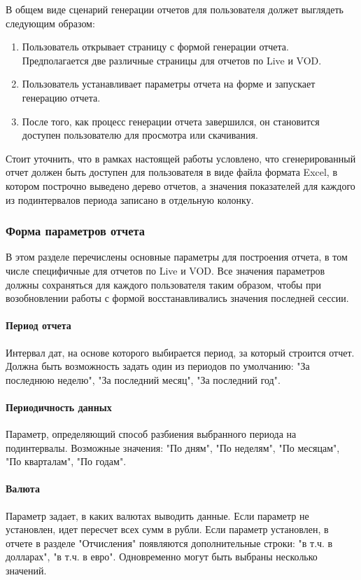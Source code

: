 В общем виде сценарий генерации отчетов для пользователя должет выглядеть следующим образом:
\begin{enumerate}
\item{
  Пользователь открывает страницу с формой генерации отчета. Предполагается две различные страницы
  для отчетов по Live и VOD.
}
\item{
  Пользователь устанавливает параметры отчета на форме и запускает генерацию отчета.
}
\item{
  После того, как процесс генерации отчета завершился, он становится доступен пользователю для просмотра
  или скачивания.
}
\end{enumerate} 

Стоит уточнить, что в рамках настоящей работы условлено, что сгенерированный отчет должен быть доступен 
для пользователя в виде файла формата Excel, в котором построчно выведено дерево отчетов, а значения показателей
для каждого из подинтервалов периода записано в отдельную колонку.

\subsubsection{Форма параметров отчета}
В этом разделе перечислены основные параметры для построения отчета, в том числе специфичные для отчетов
по Live и VOD. Все значения параметров должны сохраняться для каждого пользователя таким образом,
чтобы при возобновлении работы с формой восстанавливались значения последней сессии.

\paragraph{Период отчета} Интервал дат, на основе которого выбирается период, за который строится отчет.
Должна быть возможность задать один из периодов по умолчанию: "За последнюю неделю", "За последний месяц",
"За последний год".

\paragraph{Периодичность данных} Параметр, определяющий способ разбиения выбранного периода на подинтервалы.
Возможные значения: "По дням", "По неделям", "По месяцам", "По кварталам", "По годам".

\paragraph{Валюта} Параметр задает, в каких валютах выводить данные. 
Если параметр не установлен, идет пересчет всех сумм в рубли. 
Если параметр установлен, в отчете в разделе "Отчисления" появляются дополнительные строки: "в т.ч. в долларах", 
"в т.ч. в евро". Одновременно могут быть выбраны несколько значений.

